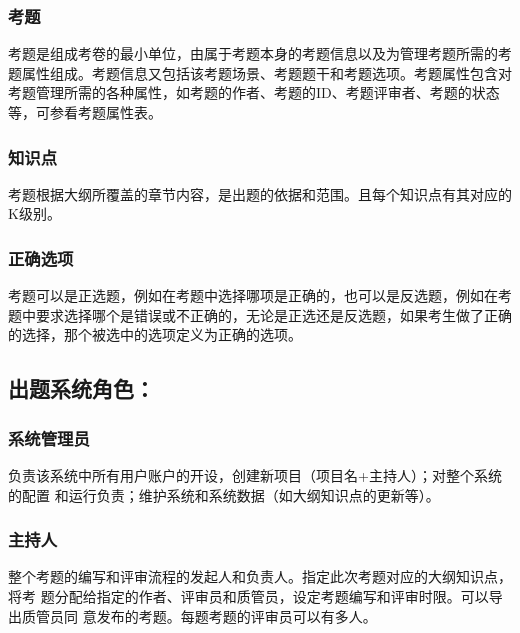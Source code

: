 \documentclass[hyperref, a4paper]{ctexart}
\begin{document}
\hypertarget{ux8003ux9898}{%
\subsubsection{考题}\label{ux8003ux9898}}

考题是组成考卷的最小单位，由属于考题本身的考题信息以及为管理考题所需的考题属性组成。考题信息又包括该考题场景、考题题干和考题选项。考题属性包含对考题管理所需的各种属性，如考题的作者、考题的ID、考题评审者、考题的状态等，可参看考题属性表。

\hypertarget{ux77e5ux8bc6ux70b9}{%
\subsubsection{知识点}\label{ux77e5ux8bc6ux70b9}}

考题根据大纲所覆盖的章节内容，是出题的依据和范围。且每个知识点有其对应的K级别。

\hypertarget{ux6b63ux786eux9009ux9879}{%
\subsubsection{正确选项}\label{ux6b63ux786eux9009ux9879}}

考题可以是正选题，例如在考题中选择哪项是正确的，也可以是反选题，例如在考题中要求选择哪个是错误或不正确的，无论是正选还是反选题，如果考生做了正确的选择，那个被选中的选项定义为正确的选项。

\hypertarget{ux51faux9898ux7cfbux7edfux89d2ux8272}{%
\subsection{出题系统角色：}\label{ux51faux9898ux7cfbux7edfux89d2ux8272}}

\hypertarget{ux7cfbux7edfux7ba1ux7406ux5458}{%
\subsubsection{系统管理员}\label{ux7cfbux7edfux7ba1ux7406ux5458}}

负责该系统中所有用户账户的开设，创建新项目（项目名+主持人）；对整个系统的配置
和运行负责；维护系统和系统数据（如大纲知识点的更新等）。

\hypertarget{ux4e3bux6301ux4eba}{%
\subsubsection{主持人}\label{ux4e3bux6301ux4eba}}

整个考题的编写和评审流程的发起人和负责人。指定此次考题对应的大纲知识点，将考
题分配给指定的作者、评审员和质管员，设定考题编写和评审时限。可以导出质管员同
意发布的考题。每题考题的评审员可以有多人。
\end{document}

